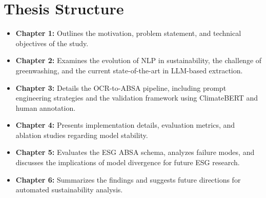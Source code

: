 \section{Thesis Structure}
\begin{itemize}
\item 

\textbf{Chapter 1:} Outlines the motivation, problem statement, and technical objectives of the study.\item 

\textbf{Chapter 2:} Examines the evolution of NLP in sustainability, the challenge of greenwashing, and the current state-of-the-art in LLM-based extraction.\item 

\textbf{Chapter 3:} Details the OCR-to-ABSA pipeline, including prompt engineering strategies and the validation framework using ClimateBERT and human annotation.\item 

\textbf{Chapter 4:} Presents implementation details, evaluation metrics, and ablation studies regarding model stability.\item 

\textbf{Chapter 5:} Evaluates the ESG ABSA schema, analyzes failure modes, and discusses the implications of model divergence for future ESG research.\item 

\textbf{Chapter 6:} Summarizes the findings and suggests future directions for automated sustainability analysis.
\end{itemize}